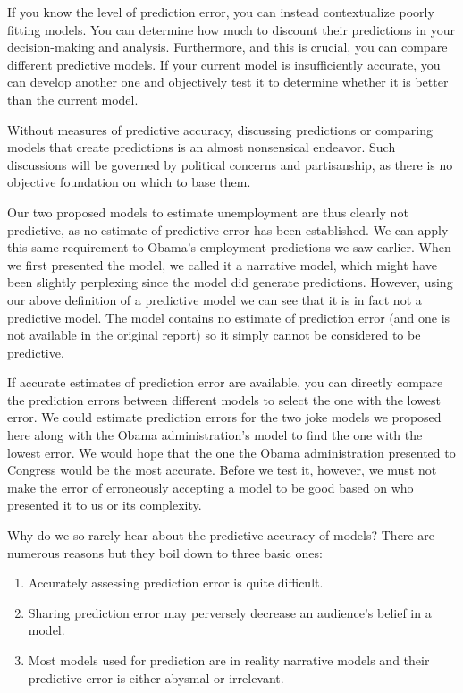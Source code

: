\documentclass[]{memoir}
\begin{document}
If you know the level of prediction error, you can instead contextualize
poorly fitting models. You can determine how much to discount their
predictions in your decision-making and analysis. Furthermore, and this
is crucial, you can compare different predictive models. If your current
model is insufficiently accurate, you can develop another one and
objectively test it to determine whether it is better than the current
model.

Without measures of predictive accuracy, discussing predictions or
comparing models that create predictions is an almost nonsensical
endeavor. Such discussions will be governed by political concerns and
partisanship, as there is no objective foundation on which to base them.

Our two proposed models to estimate unemployment are thus clearly not
predictive, as no estimate of predictive error has been established. We
can apply this same requirement to Obama's employment predictions we saw
earlier. When we first presented the model, we called it a narrative
model, which might have been slightly perplexing since the model did
generate predictions. However, using our above definition of a
predictive model we can see that it is in fact not a predictive model.
The model contains no estimate of prediction error (and one is not
available in the original report) so it simply cannot be considered to
be predictive.

If accurate estimates of prediction error are available, you can
directly compare the prediction errors between different models to
select the one with the lowest error. We could estimate prediction
errors for the two joke models we proposed here along with the Obama
administration's model to find the one with the lowest error. We would
hope that the one the Obama administration presented to Congress would
be the most accurate. Before we test it, however, we must not make the
error of erroneously accepting a model to be good based on who presented
it to us or its complexity.

Why do we so rarely hear about the predictive accuracy of models? There
are numerous reasons but they boil down to three basic ones:

\begin{enumerate}
\def\labelenumi{\arabic{enumi}.}
\itemsep1pt\parskip0pt
\item
  Accurately assessing prediction error is quite difficult.
\item
  Sharing prediction error may perversely decrease an audience's belief
  in a model.
\item
  Most models used for prediction are in reality narrative models and
  their predictive error is either abysmal or irrelevant.
\end{enumerate}
\end{document}

